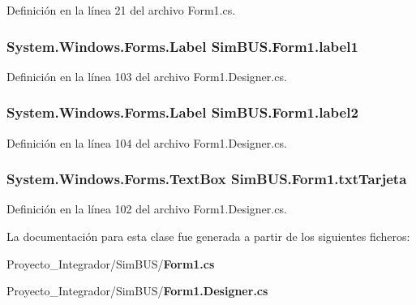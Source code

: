 Definición en la línea 21 del archivo Form1.\-cs.

\subsubsection[{label1}]{\setlength{\rightskip}{0pt plus 5cm}System.\-Windows.\-Forms.\-Label Sim\-B\-U\-S.\-Form1.\-label1\hspace{0.3cm}{\ttfamily [private]}}\label{class_sim_b_u_s_1_1_form1_adac0751fdf7e3390d196ecea128625c3}


Definición en la línea 103 del archivo Form1.\-Designer.\-cs.

\subsubsection[{label2}]{\setlength{\rightskip}{0pt plus 5cm}System.\-Windows.\-Forms.\-Label Sim\-B\-U\-S.\-Form1.\-label2\hspace{0.3cm}{\ttfamily [private]}}\label{class_sim_b_u_s_1_1_form1_a115ebabe78edea2089bfc342de0efac1}


Definición en la línea 104 del archivo Form1.\-Designer.\-cs.

\subsubsection[{txt\-Tarjeta}]{\setlength{\rightskip}{0pt plus 5cm}System.\-Windows.\-Forms.\-Text\-Box Sim\-B\-U\-S.\-Form1.\-txt\-Tarjeta\hspace{0.3cm}{\ttfamily [private]}}\label{class_sim_b_u_s_1_1_form1_aa57f8afdf42ccf599ed26284ab1aa7db}


Definición en la línea 102 del archivo Form1.\-Designer.\-cs.



La documentación para esta clase fue generada a partir de los siguientes ficheros\-:\begin{DoxyCompactItemize}
\item 
Proyecto\-\_\-\-Integrador/\-Sim\-B\-U\-S/{\bf Form1.\-cs}\item 
Proyecto\-\_\-\-Integrador/\-Sim\-B\-U\-S/{\bf Form1.\-Designer.\-cs}\end{DoxyCompactItemize}
